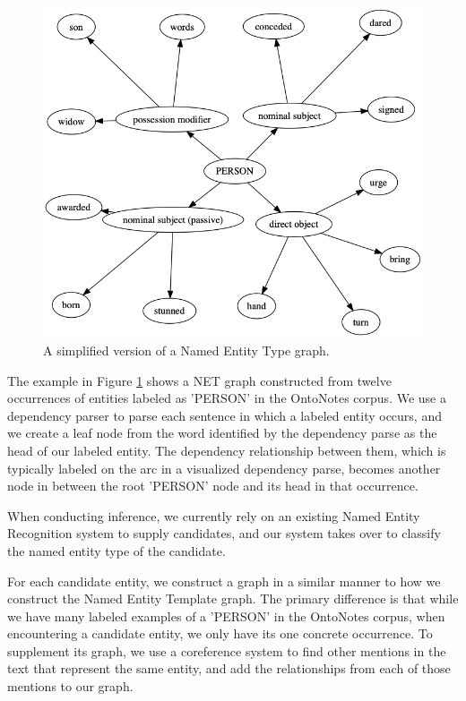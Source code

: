 \documentclass[11pt,a4paper]{article}
\begin{document}
\begin{figure}[h]
  \includegraphics[width=\linewidth]{figures/G_PERSON.png}
  \caption{A simplified version of a Named Entity Type graph.}
  \label{fig:person_graph}
\end{figure}

The example in Figure \ref{fig:person_graph} shows a NET graph constructed from twelve occurrences of entities labeled as 'PERSON' in the OntoNotes corpus. We use a dependency parser to parse each sentence in which a labeled entity occurs, and we create a leaf node from the word identified by the dependency parse as the head of our labeled entity. The dependency relationship between them, which is typically labeled on the arc in a visualized dependency parse, becomes another node in between the root 'PERSON' node and its head in that occurrence.

When conducting inference, we currently rely on an existing Named Entity Recognition system to supply candidates, and our system takes over to classify the named entity type of the candidate.

For each candidate entity, we construct a graph in a similar manner to how we construct the Named Entity Template graph. The primary difference is that while we have many labeled examples of a 'PERSON' in the OntoNotes corpus, when encountering a candidate entity, we only have its one concrete occurrence. To supplement its graph, we use a coreference system to find other mentions in the text that represent the same entity, and add the relationships from each of those mentions to our graph.
\end{document}
